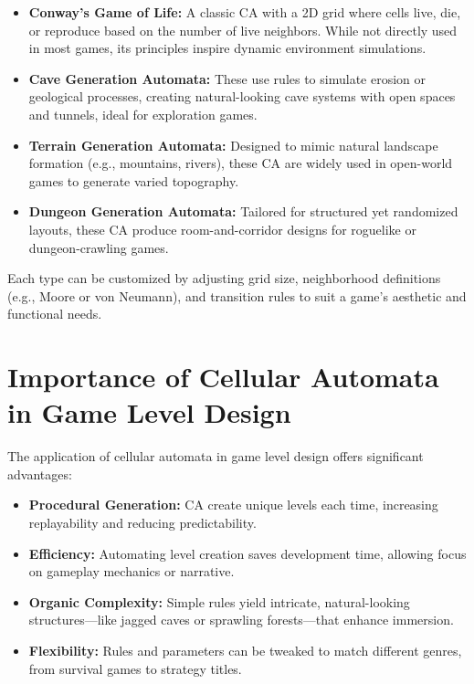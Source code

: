 \documentclass{article}
\begin{document}
\begin{itemize}
    \item \textbf{Conway's Game of Life:} A classic CA with a 2D grid where cells live, die, or reproduce based on the number of live neighbors. While not directly used in most games, its principles inspire dynamic environment simulations.
    \item \textbf{Cave Generation Automata:} These use rules to simulate erosion or geological processes, creating natural-looking cave systems with open spaces and tunnels, ideal for exploration games.
    \item \textbf{Terrain Generation Automata:} Designed to mimic natural landscape formation (e.g., mountains, rivers), these CA are widely used in open-world games to generate varied topography.
    \item \textbf{Dungeon Generation Automata:} Tailored for structured yet randomized layouts, these CA produce room-and-corridor designs for roguelike or dungeon-crawling games.
\end{itemize}

Each type can be customized by adjusting grid size, neighborhood definitions (e.g., Moore or von Neumann), and transition rules to suit a game's aesthetic and functional needs.

\section{Importance of Cellular Automata in Game Level Design}

The application of cellular automata in game level design offers significant advantages:

\begin{itemize}
    \item \textbf{Procedural Generation:} CA create unique levels each time, increasing replayability and reducing predictability.
    \item \textbf{Efficiency:} Automating level creation saves development time, allowing focus on gameplay mechanics or narrative.
    \item \textbf{Organic Complexity:} Simple rules yield intricate, natural-looking structures—like jagged caves or sprawling forests—that enhance immersion.
    \item \textbf{Flexibility:} Rules and parameters can be tweaked to match different genres, from survival games to strategy titles.
\end{itemize}
\end{document}
